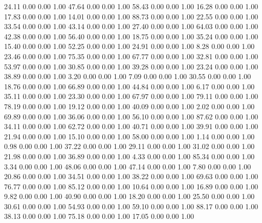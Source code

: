    24.11   0.00   0.00   1.00
   47.64   0.00   0.00   1.00
   58.43   0.00   0.00   1.00
   16.28   0.00   0.00   1.00
   17.83   0.00   0.00   1.00
   14.01   0.00   0.00   1.00
   88.73   0.00   0.00   1.00
   22.55   0.00   0.00   1.00
   33.54   0.00   0.00   1.00
   43.14   0.00   0.00   1.00
   27.40   0.00   0.00   1.00
   64.03   0.00   0.00   1.00
   42.38   0.00   0.00   1.00
   56.40   0.00   0.00   1.00
   18.75   0.00   0.00   1.00
   35.24   0.00   0.00   1.00
   15.40   0.00   0.00   1.00
   52.25   0.00   0.00   1.00
   24.91   0.00   0.00   1.00
    8.28   0.00   0.00   1.00
   23.46   0.00   0.00   1.00
   75.35   0.00   0.00   1.00
   67.77   0.00   0.00   1.00
   32.81   0.00   0.00   1.00
   53.97   0.00   0.00   1.00
   30.85   0.00   0.00   1.00
   39.28   0.00   0.00   1.00
   23.24   0.00   0.00   1.00
   38.89   0.00   0.00   1.00
    3.20   0.00   0.00   1.00
    7.09   0.00   0.00   1.00
   30.55   0.00   0.00   1.00
   18.76   0.00   0.00   1.00
   66.89   0.00   0.00   1.00
   44.84   0.00   0.00   1.00
    6.17   0.00   0.00   1.00
   35.11   0.00   0.00   1.00
   23.30   0.00   0.00   1.00
   67.97   0.00   0.00   1.00
   79.11   0.00   0.00   1.00
   78.19   0.00   0.00   1.00
   19.12   0.00   0.00   1.00
   40.09   0.00   0.00   1.00
    2.02   0.00   0.00   1.00
   69.89   0.00   0.00   1.00
   36.06   0.00   0.00   1.00
   56.10   0.00   0.00   1.00
   87.62   0.00   0.00   1.00
   34.11   0.00   0.00   1.00
   62.72   0.00   0.00   1.00
   40.71   0.00   0.00   1.00
   39.91   0.00   0.00   1.00
   21.94   0.00   0.00   1.00
   15.10   0.00   0.00   1.00
   58.00   0.00   0.00   1.00
    1.14   0.00   0.00   1.00
    0.98   0.00   0.00   1.00
   37.22   0.00   0.00   1.00
   29.11   0.00   0.00   1.00
   31.02   0.00   0.00   1.00
   21.98   0.00   0.00   1.00
   36.89   0.00   0.00   1.00
    4.33   0.00   0.00   1.00
   85.34   0.00   0.00   1.00
    3.34   0.00   0.00   1.00
   48.06   0.00   0.00   1.00
   47.14   0.00   0.00   1.00
    7.80   0.00   0.00   1.00
   20.86   0.00   0.00   1.00
   34.51   0.00   0.00   1.00
   38.22   0.00   0.00   1.00
   69.63   0.00   0.00   1.00
   76.77   0.00   0.00   1.00
   85.12   0.00   0.00   1.00
   10.64   0.00   0.00   1.00
   16.89   0.00   0.00   1.00
    9.82   0.00   0.00   1.00
   40.90   0.00   0.00   1.00
   18.20   0.00   0.00   1.00
   25.50   0.00   0.00   1.00
   30.61   0.00   0.00   1.00
   54.93   0.00   0.00   1.00
   59.10   0.00   0.00   1.00
   88.17   0.00   0.00   1.00
   38.13   0.00   0.00   1.00
   75.18   0.00   0.00   1.00
   17.05   0.00   0.00   1.00
